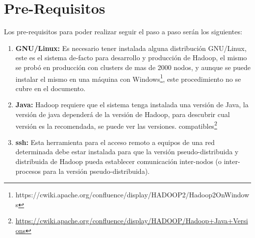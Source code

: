 \section{Pre-Requisitos}
\label{sec:prerequisitos}

Los pre-requisitos para poder realizar seguir el paso a paso serán los
siguientes:

\begin{enumerate}
\item {\bf GNU/Linux:} Es necesario tener instalada alguna distribución
GNU/Linux, este es el sistema de-facto para desarrollo y producción
de Hadoop, el mismo se probó en producción con clusters de mas de
2000 nodos, y aunque se puede instalar el mismo en una máquina con
Windows\footnote{https://cwiki.apache.org/confluence/display/HADOOP2/Hadoop2OnWindows},
este procedimiento no se cubre en el documento.
\item {\bf Java:} Hadoop requiere que el sistema tenga instalada una versión de
Java, la versión de java dependerá de la versión de Hadoop, para descubrir cual
versión es la recomendada, se puede ver las versiones.
compatibles\footnote{\url{https://cwiki.apache.org/confluence/display/HADOOP/Hadoop+Java+Versions}}
\item {\bf ssh:} Esta herramienta para el acceso remoto a equipos de una red
determinada debe estar instalada para que la versión
pseudo-distribuida y distribuida de Hadoop pueda establecer comunicación
inter-nodos (o inter-procesos para la versión pseudo-distribuida).
\end{enumerate}

